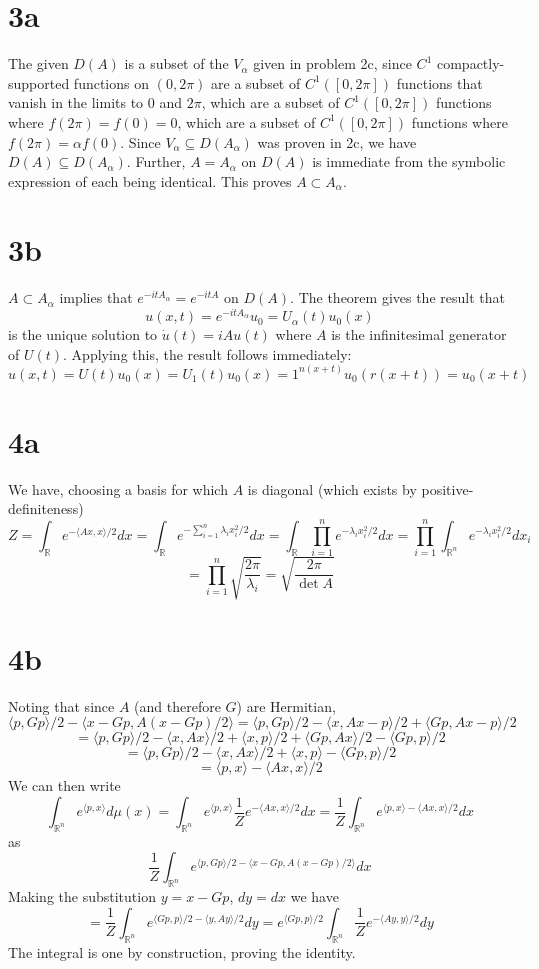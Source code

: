 \documentclass{article}
\begin{document}
\section*{3a}
The given $D(A)$ is a subset of the $V_{\alpha}$ given in problem 2c, since $C^{1}$ compactly-supported functions on $(0,2\pi)$ are a subset
of $C^{1}([0,2\pi])$ functions that vanish in the limits to $0$ and $2\pi$, which are a subset of $C^{1}([0,2\pi])$ functions where
$f(2\pi)=f(0)=0$, which are a subset of $C^{1}([0,2\pi])$ functions where $f(2\pi)=\alpha f(0)$.
Since $V_{\alpha}\subseteq D(A_{\alpha})$ was proven in 2c, we have $D(A)\subseteq D(A_{\alpha})$.
Further, $A=A_{\alpha}$ on $D(A)$ is immediate from the symbolic expression of each being identical.
This proves $A\subset A_{\alpha}$.

\section*{3b}
$A\subset A_{\alpha}$ implies that $e^{-itA_{\alpha}}=e^{-itA}$ on $D(A)$.
The theorem gives the result that
\[
  u(x,t)=e^{-itA_{\alpha}}u_{0}=U_{\alpha}(t)u_{0}(x)
\]
is the unique solution to $\dot{u}(t)=iAu(t)$ where $A$ is the infinitesimal generator of
$U(t)$.
Applying this, the result follows immediately:
\[
  u(x,t) = U(t)u_{0}(x) = U_{1}(t)u_{0}(x)=1^{n(x+t)}u_{0}(r(x+t))=u_{0}(x+t)
\]

\section*{4a}
We have, choosing a basis for which $A$ is diagonal (which exists by positive-definiteness)
\[
  Z=\int_{\mathbb{R}}e^{-\langle Ax,x  \rangle/2}dx
  =\int_{\mathbb{R}}e^{-\sum_{i=1}^{n}\lambda_{i}x_{i}^{2}/2}dx
  =\int_{\mathbb{R}}\prod_{i=1}^{n}e^{-\lambda_{i}x_{i}^{2}/2}dx
  =\prod_{i=1}^{n}\int_{\mathbb{R}^{n}}e^{-\lambda_{i}x_{i}^{2}/2}dx_{i}
\]
\[
  =\prod_{i=1}^{n}\sqrt{\frac{2\pi}{\lambda_{i}}}=\sqrt{\frac{2\pi}{\det A}}
\]
\section*{4b}
Noting that since $A$ (and therefore $G$) are Hermitian,
\[
  \langle p,Gp \rangle/2-\langle x-Gp,A(x-Gp)/2 \rangle
  =\langle p,Gp  \rangle/2-\langle x,Ax-p \rangle/2+\langle Gp,Ax-p \rangle/2
\]
\[
  =\langle p,Gp \rangle/2 - \langle x,Ax \rangle/2+\langle x,p \rangle/2+\langle Gp,Ax \rangle/2-\langle Gp,p \rangle/2
\]
\[
  =\langle p,Gp \rangle/2-\langle x,Ax\rangle/2+ \langle x,p \rangle - \langle Gp,p \rangle/2
\]
\[
  =\langle p,x \rangle-\langle Ax,x \rangle/2
\]
We can then write
\[
  \int_{\mathbb{R}^{n}}e^{\langle p,x \rangle}d\mu(x)
  =\int_{\mathbb{R}^{n}}e^{\langle p,x \rangle}\frac{1}{Z}e^{-\langle Ax,x \rangle/2}dx
  =\frac{1}{Z}\int_{\mathbb{R}^{n}}e^{\langle p,x \rangle-\langle Ax,x \rangle/2}dx
\]
as
\[
  \frac{1}{Z}\int_{\mathbb{R}^{n}}e^{\langle p,Gp \rangle/2-\langle x-Gp,A(x-Gp)/2 \rangle}dx
\]
Making the substitution $y=x-Gp$, $dy=dx$ we have
\[
  =\frac{1}{Z}\int_{\mathbb{R}^{n}}e^{\langle Gp,p \rangle/2-\langle y,Ay \rangle/2}dy
  =e^{\langle Gp,p \rangle/2}\int_{\mathbb{R}^{n}}\frac{1}{Z}e^{-\langle Ay,y \rangle/2}dy
\]
The integral is one by construction, proving the identity.
\end{document}
